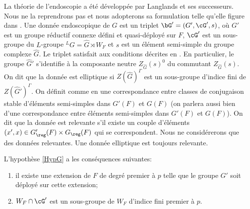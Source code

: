La théorie de l'endoscopie a été développée par Langlands et ses successeurs. Nous ne la reprendrons pas et nous adopterons sa formulation telle qu'elle figure dans \cite{MW}. Une donnée endoscopique de $G$ est un triplet $\bG'=(G',\cG',s)$, où $G'$ est un groupe réductif connexe défini et quasi-déployé sur $F$, $\cG'$ est un sous-groupe du $L$-groupe $^LG=\hat{G}\rtimes W_{F}$ et $s$ est un élément semi-simple du groupe complexe $\hat{G}$. Le triplet satisfait aux conditions décrites en \cite[I.1.5]{MW}. En particulier, le groupe $\hat{G}'$ s'identifie à la composante neutre $Z_{\hat{G}}(s)^0$ du commutant $Z_{\hat{G}}(s)$. On dit que la donnée est elliptique si $Z(\hat{G})^{\Gamma}$ est un sous-groupe d'indice fini de $Z(\hat{G}')^{\Gamma}$. On définit comme en \cite[I.1.10]{MW} une correspondance entre classes de conjugaison stable d'éléments semi-simples dans $G'(F)$ et $G(F)$ (on parlera aussi bien d'une correspondance entre éléments semi-simples dans $G'(F)$ et $G(F)$). On dit que la donnée est relevante s'il existe un couple d'éléments $(x',x)\in G'_{\reg}(F)\times G_{\reg}(F)$ qui se correspondent. Nous ne considérerons que des données relevantes. Une donnée elliptique est toujours relevante.

L'hypothèse \ref{HypG} a les conséquences suivantes:
\begin{enumerate}
\item\label{donneesendoscopiques1}
il existe une extension de $F$ de degré premier à $p$ telle que le groupe $G'$ soit déployé sur cette extension;

\item\label{donneesendoscopiques2}
$W_{F}\cap \cG'$ est un sous-groupe de $W_{F}$ d'indice fini premier à $p$.
\end{enumerate}

